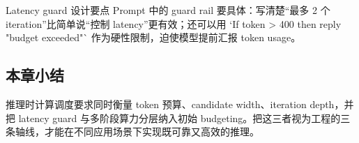 \begin{warningbox}{Latency guard 设计要点}
Prompt 中的 guard rail 要具体：写清楚“最多 2 个 iteration”比简单说“控制 latency”更有效；还可以用 `If token > 400 then reply "budget exceeded"` 作为硬性限制，迫使模型提前汇报 token usage。
\end{warningbox}

\subsection{本章小结}
推理时计算调度要求同时衡量 token 预算、candidate width、iteration depth，并把 latency guard 与多阶段算力分层纳入初始 budgeting。把这三者视为工程的三条轴线，才能在不同应用场景下实现既可靠又高效的推理。

